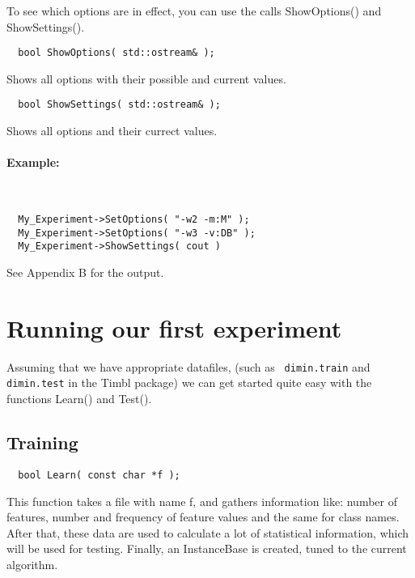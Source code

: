 \documentclass{article}
\begin{document}
To see which options are in effect, you can use the calls ShowOptions()
and ShowSettings().

\begin{verbatim}
  bool ShowOptions( std::ostream& );
\end{verbatim}

Shows all options with their possible and current values.

\begin{verbatim}
  bool ShowSettings( std::ostream& );
\end{verbatim}

Shows all options and their currect values.\\

\paragraph{Example:}\ \\

\begin{verbatim}
  My_Experiment->SetOptions( "-w2 -m:M" );
  My_Experiment->SetOptions( "-w3 -v:DB" );
  My_Experiment->ShowSettings( cout )
\end{verbatim}

See Appendix B for the output.

\section{Running our first experiment}

Assuming that we have appropriate datafiles, (such as {\tt
dimin.train} and {\tt dimin.test} in the Timbl package) we can get
started quite easy with the functions Learn() and Test().

\subsection{Training}
\begin{verbatim}
  bool Learn( const char *f );
\end{verbatim}

This function takes a file with name f, and gathers information like: number
of features, number and frequency of feature values and the same for
class names. \\
After that, these data are used to calculate a lot of statistical
information, which will be used for testing. Finally, an InstanceBase
is created, tuned to the current algorithm.\\ 
\end{document}
